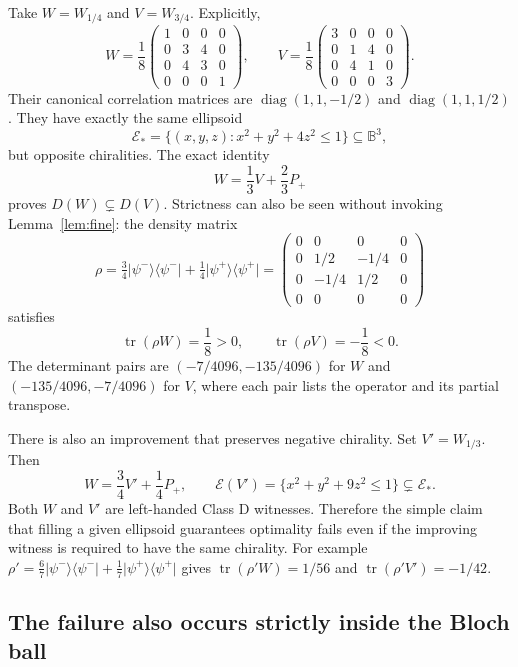 \documentclass[11pt,a4paper]{article}
\theoremstyle{definition}\newtheorem{definition}[theorem]{Definition}
\newcommand{\tr}{\operatorname{tr}}
\newcommand{\B}{\mathbb B^3}
\newcommand{\E}{\mathcal E}
\newcommand{\ket}[1]{\lvert #1\rangle}
\newcommand{\bra}[1]{\langle #1\rvert}
\newcommand{\proj}[1]{\ket{#1}\bra{#1}}
\theoremstyle{plain}\newtheorem*{theorem*}{Theorem}
\begin{document}
Take $W=W_{1/4}$ and $V=W_{3/4}$. Explicitly,
\[
 W=\frac18\begin{pmatrix}1&0&0&0\\0&3&4&0\\0&4&3&0\\0&0&0&1\end{pmatrix},
 \qquad
 V=\frac18\begin{pmatrix}3&0&0&0\\0&1&4&0\\0&4&1&0\\0&0&0&3\end{pmatrix}.
\]
Their canonical correlation matrices are $\operatorname{diag}(1,1,-1/2)$ and $\operatorname{diag}(1,1,1/2)$. They have exactly the same ellipsoid
\begin{equation}\label{eq:exampleE}
 \E_* = \{(x,y,z):x^2+y^2+4z^2\leq1\}\subseteq\B,
\end{equation}
but opposite chiralities. The exact identity
\begin{equation}\label{eq:counter-id}
 \boxed{W=\frac13 V+\frac23P_+}
\end{equation}
proves $D(W)\subsetneq D(V)$. Strictness can also be seen without invoking Lemma~\ref{lem:fine}: the density matrix
\[
 \rho=\tfrac34\proj{\psi^-}+\tfrac14\proj{\psi^+}
 =\begin{pmatrix}0&0&0&0\\0&1/2&-1/4&0\\0&-1/4&1/2&0\\0&0&0&0\end{pmatrix}
\]
satisfies
\[
 \tr(\rho W)=\frac18>0,\qquad \tr(\rho V)=-\frac18<0.
\]
The determinant pairs are $(-7/4096,-135/4096)$ for $W$ and $(-135/4096,-7/4096)$ for $V$, where each pair lists the operator and its partial transpose.

There is also an improvement that preserves negative chirality. Set $V'=W_{1/3}$. Then
\[
 W=\frac34V'+\frac14P_+,
 \qquad
 \E(V')=\{x^2+y^2+9z^2\leq1\}\subsetneq\E_*.
\]
Both $W$ and $V'$ are left-handed Class D witnesses. Therefore the simple claim that filling a given ellipsoid guarantees optimality fails even if the improving witness is required to have the same chirality. For example $\rho'=\tfrac67\proj{\psi^-}+\tfrac17\proj{\psi^+}$ gives $\tr(\rho'W)=1/56$ and $\tr(\rho'V')=-1/42$.

\subsection{The failure also occurs strictly inside the Bloch ball}
\end{document}
